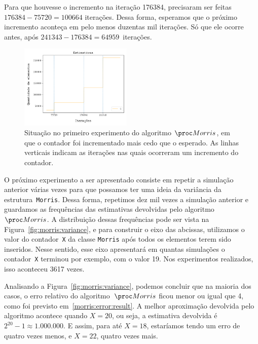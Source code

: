 Para que houvesse o incremento na iteração 176384, precisaram ser feitas $176384 - 75720 = 100664$ iterações. Dessa 
forma, esperamos que o próximo incremento aconteça em pelo menos duzentas mil iterações. Só que ele ocorre antes, após 
$241343 - 176384 = 64959$~iterações.

\begin{figure}[h]
  \centering
  \includegraphics[height=4cm, width=.5\textwidth]{figuras/morris_interval.png}
	\caption{Situação no primeiro experimento do algoritmo $\Morris$, em que o contador foi incrementado mais cedo que o 
  esperado. As linhas verticais indicam as iterações nas quais ocorreram um incremento do contador. }
  \label{fig:morris:interval}
\end{figure}

\newpage
O próximo experimento a ser apresentado consiste em repetir a simulação anterior várias vezes para que possamos ter uma 
ideia da variância da estrutura~\texttt{Morris}. Dessa forma, repetimos dez mil vezes a simulação anterior e guardamos 
as frequências das estimativas devolvidas pelo algoritmo~$\Morris$. A distribuição dessas frequências pode ser vista na 
Figura~\ref{fig:morris:variance}, e para construir o eixo das abcissas, utilizamos o valor do contador~\texttt{X} da 
classe \texttt{Morris} após todos os elementos terem sido inseridos. Nesse sentido, esse eixo apresentará em quantas 
simulações o contador~\texttt{X} terminou por exemplo, com o valor 19. Nos experimentos realizados, isso aconteceu 3617 
vezes.

Analisando a Figura~\ref{fig:morris:variance}, podemos concluir que na maioria dos casos, o erro relativo do 
algoritmo~$\Morris$ ficou menor ou igual que 4, como foi previsto em~\eqref{morris:error:result}. A melhor aproximação 
devolvida pelo algoritmo acontece quando $X = 20$, ou seja, a estimativa devolvida é $2^{20} - 1 \approx 1.000.000$. E 
assim, para até $X = 18$, estaríamos tendo um erro de quatro vezes menos, e $X = 22$, quatro vezes mais.

